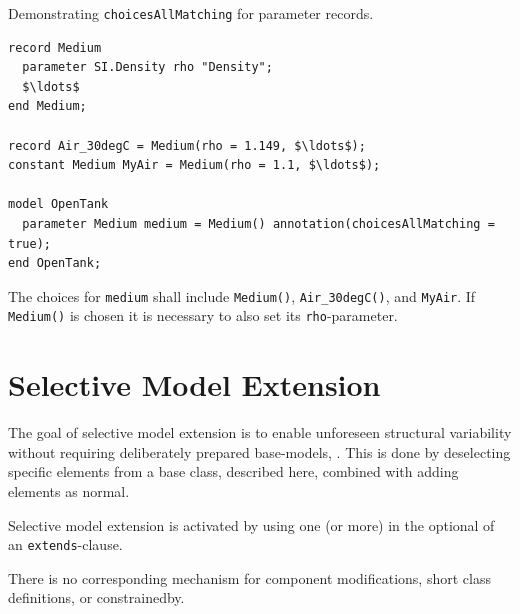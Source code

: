 \begin{example}
Demonstrating \lstinline!choicesAllMatching! for parameter records.
\begin{lstlisting}[language=modelica]
record Medium
  parameter SI.Density rho "Density";
  $\ldots$
end Medium;

record Air_30degC = Medium(rho = 1.149, $\ldots$);
constant Medium MyAir = Medium(rho = 1.1, $\ldots$);

model OpenTank
  parameter Medium medium = Medium() annotation(choicesAllMatching = true);
end OpenTank;
\end{lstlisting}
The choices for \lstinline!medium! shall include \lstinline!Medium()!, \lstinline!Air_30degC()!, and \lstinline!MyAir!.
If \lstinline!Medium()! is chosen it is necessary to also set its \lstinline!rho!-parameter.
\end{example}


\section{Selective Model Extension}\label{selective-model-extension}

\begin{nonnormative}
The goal of selective model extension is to enable unforeseen structural variability without requiring deliberately prepared base-models, \textcite{Buerger2019SelectiveModel}.
This is done by deselecting specific elements from a base class, described here, combined with adding elements as normal.
\end{nonnormative}

Selective model extension is activated by using one (or more)  in the optional  of an \lstinline!extends!-clause.

\begin{nonnormative}
There is no corresponding mechanism for component modifications, short class definitions, or constrainedby.
\end{nonnormative}

